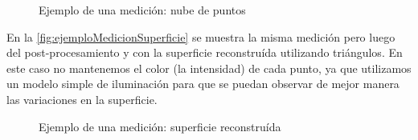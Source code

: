 \begin{figure}[!bth]
    \myfloatalign
        \caption{Ejemplo de una medición: nube de puntos}
        \label{fig:ejemploMedicionNubeDePuntos}
\end{figure}

En la \autoref{fig:ejemploMedicionSuperficie} se muestra la misma medición pero luego del post-procesamiento y con la superficie reconstruída utilizando triángulos. En este caso no mantenemos el color (la intensidad) de cada punto, ya que utilizamos un modelo simple de iluminación para que se puedan observar de mejor manera las variaciones en la superficie.

\begin{figure}[!bth]
    \myfloatalign
        \caption{Ejemplo de una medición: superficie reconstruída}
        \label{fig:ejemploMedicionSuperficie}
\end{figure}

